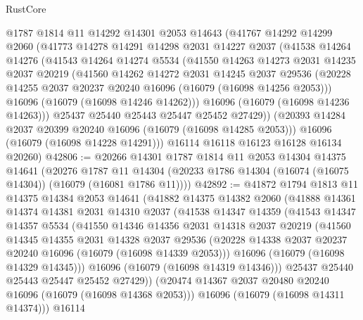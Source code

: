\begin{lexlean}{RustCore}
\begin{coremodule}
    @1787
    @1814
    @11
    @14292
    @14301
    @2053
    @14643
    (@41767
      @14292
      @14299
      @2060
      (@41773
        @14278
        @14291
        @14298
        @2031
        @14227
        @2037
        (@41538
          @14264
          @14276
          (@41543
            @14264
            @14274
            @5534
            (@41550
              @14263
              @14273
              @2031
              @14235
              @2037
              @20219
              (@41560
                @14262
                @14272
                @2031
                @14245
                @2037
                @29536
                (@20228 @14255 @2037 @20237 @20240 @16096 (@16079 (@16098 @14256 @2053)))
                @16096
                (@16079 (@16098 @14246 @14262)))
              @16096
              (@16079 (@16098 @14236 @14263)))
            @25437
            @25440
            @25443
            @25447
            @25452
            @27429))
        (@20393 @14284 @2037 @20399 @20240 @16096 (@16079 (@16098 @14285 @2053)))
        @16096
        (@16079 (@16098 @14228 @14291)))
      @16114
      @16118
      @16123
      @16128
      @16134
      @20260)
@42806 := @20266
    @14301
    @1787
    @1814
    @11
    @2053
    @14304
    @14375
    @14641
    (@20276
      @1787
      @11
      @14304
      (@20233 @1786 @14304 (@16074 (@16075 @14304)) (@16079 (@16081 @1786 @11))))
@42892 := @41872
    @1794
    @1813
    @11
    @14375
    @14384
    @2053
    @14641
    (@41882
      @14375
      @14382
      @2060
      (@41888
        @14361
        @14374
        @14381
        @2031
        @14310
        @2037
        (@41538
          @14347
          @14359
          (@41543
            @14347
            @14357
            @5534
            (@41550
              @14346
              @14356
              @2031
              @14318
              @2037
              @20219
              (@41560
                @14345
                @14355
                @2031
                @14328
                @2037
                @29536
                (@20228 @14338 @2037 @20237 @20240 @16096 (@16079 (@16098 @14339 @2053)))
                @16096
                (@16079 (@16098 @14329 @14345)))
              @16096
              (@16079 (@16098 @14319 @14346)))
            @25437
            @25440
            @25443
            @25447
            @25452
            @27429))
        (@20474 @14367 @2037 @20480 @20240 @16096 (@16079 (@16098 @14368 @2053)))
        @16096
        (@16079 (@16098 @14311 @14374)))
      @16114

\end{coremodule}
\end{lexlean}
